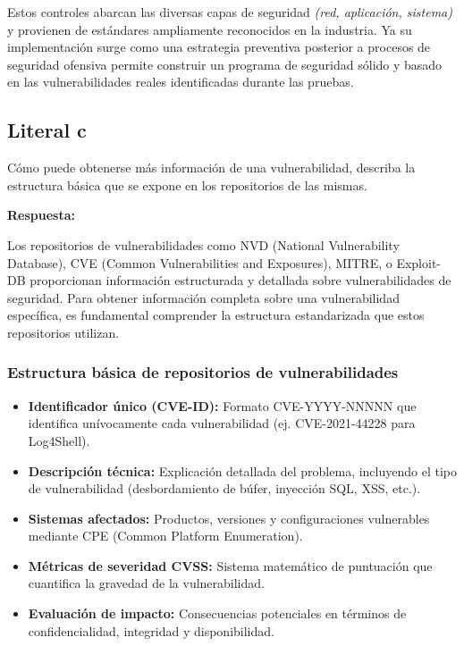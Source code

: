 {Estos controles abarcan las diversas capas de seguridad \textit{(red, aplicación, sistema)} y provienen de estándares ampliamente reconocidos en la industria. Ya su implementación surge como una estrategia preventiva posterior a procesos de seguridad ofensiva permite construir un programa de seguridad sólido y basado en las vulnerabilidades reales identificadas durante las pruebas.




\subsection{Literal c}
Cómo puede obtenerse más información de una vulnerabilidad, describa la estructura básica que se expone en los repositorios de las mismas.

\textbf{Respuesta:}

Los repositorios de vulnerabilidades como NVD (National Vulnerability Database), CVE (Common Vulnerabilities and Exposures), MITRE, o Exploit-DB proporcionan información estructurada y detallada sobre vulnerabilidades de seguridad. Para obtener información completa sobre una vulnerabilidad específica, es fundamental comprender la estructura estandarizada que estos repositorios utilizan.

\subsubsection{Estructura básica de repositorios de vulnerabilidades}

\begin{itemize}
    \item \textbf{Identificador único (CVE-ID):} Formato CVE-YYYY-NNNNN que identifica unívocamente cada vulnerabilidad (ej. CVE-2021-44228 para Log4Shell).
    
    \item \textbf{Descripción técnica:} Explicación detallada del problema, incluyendo el tipo de vulnerabilidad (desbordamiento de búfer, inyección SQL, XSS, etc.).
    
    \item \textbf{Sistemas afectados:} Productos, versiones y configuraciones vulnerables mediante CPE (Common Platform Enumeration).
    
    \item \textbf{Métricas de severidad CVSS:} Sistema matemático de puntuación que cuantifica la gravedad de la vulnerabilidad.
    
    \item \textbf{Evaluación de impacto:} Consecuencias potenciales en términos de confidencialidad, integridad y disponibilidad.
    

\end{itemize}}
